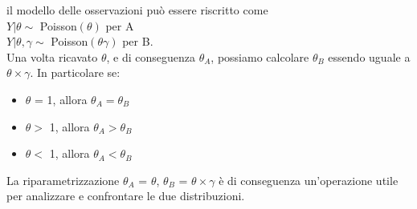 il modello delle osservazioni può essere riscritto come\\

$Y|\theta \sim$ Poisson$(\theta)$ per A\\

$Y|\theta, \gamma \sim$ Poisson$(\theta\gamma)$ per B.\\

Una volta ricavato $\theta$, e di conseguenza $\theta_A$, possiamo calcolare $\theta_B$ essendo uguale a $\theta \times \gamma$.
In particolare se:
\begin{itemize}
\item $\theta$ = 1, allora $\theta_A = \theta_B$
\item $\theta >$ 1, allora $\theta_A > \theta_B$
\item $\theta <$ 1, allora $\theta_A < \theta_B$
\end{itemize}

La riparametrizzazione $\theta_A$ = $\theta$, $\theta_B$ = $\theta \times \gamma$ è di conseguenza un'operazione utile per analizzare e confrontare le due distribuzioni.

